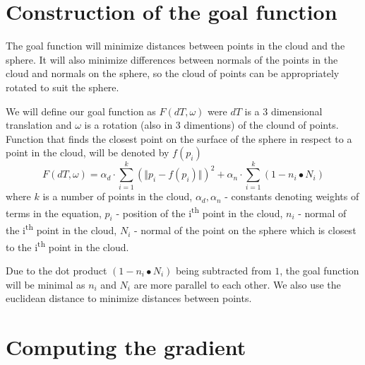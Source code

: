\documentclass{book}
\begin{document}
\section{Construction of the goal function}
The goal function will minimize distances between points in the cloud and the sphere. It will also minimize differences between normals of the points in the cloud and normals on the sphere, so the cloud of points can be appropriately rotated to suit the sphere.  

We will define our goal function as $F(dT, \omega)$ were $dT$ is a 3 dimensional translation and $\omega$ is a rotation (also in 3 dimentions) of the clound of points. Function that finds the closest point on the surface of the sphere in respect to a point in the cloud, will be denoted by $f(p_i)$
$$F(dT, \omega) = \alpha_d \cdot \sum_{i=1}^{k}(\Vert p_i-f(p_i) \Vert)^2 + \alpha_n \cdot \sum_{i=1}^{k}(1-n_i \bullet N_i)$$
where $k$ is a number of points in the cloud, $\alpha_d, \alpha_n$ - constants denoting weights of terms in the equation, $p_i$ - position of the i\textsuperscript{th} point in the cloud, $n_i$ - normal of the i\textsuperscript{th} point in the cloud, $N_i$ - normal of the point on the sphere which is closest to the i\textsuperscript{th} point in the cloud.

Due to the dot product $(1-n_i \bullet N_i)$ being subtracted from $1$, the goal function will be minimal as $n_i$ and $N_i$ are more parallel to each other. We also use the euclidean distance to minimize distances between points.

\section{Computing the gradient}
\end{document}
